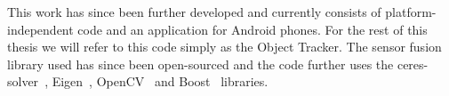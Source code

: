 This work has since been further developed and currently consists of platform-independent \Cpp code and an application for Android phones. For the rest of this thesis we will refer to this code simply as the Object Tracker. The sensor fusion library used has since been open-sourced \cite{ConFusion} and the code further uses the ceres-solver~\cite{ceres-solver}, Eigen~\cite{eigen}, OpenCV~\cite{opencv_library} and Boost~\cite{boost} libraries.